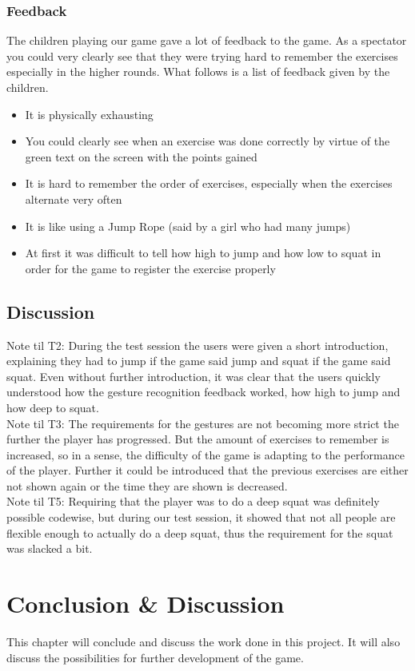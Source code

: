 \documentclass[11pt]{report}
\begin{document}
\subsection{Feedback}
The children playing our game gave a lot of feedback to the game. As a spectator you could very clearly see that they were trying hard to remember the exercises especially in the higher rounds. What follows is a list of feedback given by the children.
\begin{itemize}
\item It is physically exhausting
\item You could clearly see when an exercise was done correctly by virtue of the green text on the screen with the points gained
\item It is hard to remember the order of exercises, especially when the exercises alternate very often
\item It is like using a Jump Rope (said by a girl who had many jumps)
\item At first it was difficult to tell how high to jump and how low to squat in order for the game to register the exercise properly
\end{itemize}

\section{Discussion}
Note til T2: During the test session the users were given a short introduction, explaining they had to jump if the game said jump and squat if the game said squat. Even without further introduction, it was clear that the users quickly understood how the gesture recognition feedback worked, how high to jump and how deep to squat.\\
Note til T3: The requirements for the gestures are not becoming more strict the further the player has progressed. But the amount of exercises to remember is increased, so in a sense, the difficulty of the game is adapting to the performance of the player. Further it could be introduced that the previous exercises are either not shown again or the time they are shown is decreased.\\
Note til T5: Requiring that the player was to do a deep squat was definitely possible codewise, but during our test session, it showed that not all people are flexible enough to actually do a deep squat, thus the requirement for the squat was slacked a bit.

\chapter{Conclusion \& Discussion}
This chapter will conclude and discuss the work done in this project. It will also discuss the possibilities for further development of the game.
\end{document}
